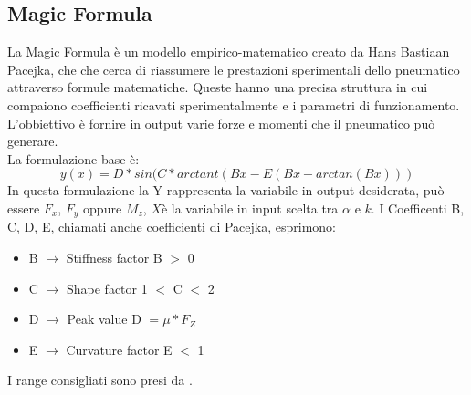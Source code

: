 \subsection{Magic Formula}
La Magic Formula è un modello empirico-matematico creato da Hans Bastiaan Pacejka, che che cerca di riassumere le prestazioni sperimentali dello pneumatico attraverso formule matematiche. Queste hanno una precisa struttura in cui compaiono coefficienti ricavati sperimentalmente e i parametri di funzionamento. L'obbiettivo è fornire in output varie forze e momenti che il pneumatico può generare.\\
La formulazione base è:
\begin{equation}
\label{eq:Pacjeka}
    y(x)=D*sin(C*arctant(Bx-E(Bx-arctan(Bx)))
\end{equation}
In questa formulazione la Y rappresenta la variabile in output desiderata, può essere
$F_x$, $F_y$ oppure $M_z$, $X$è la variabile in input scelta tra $\alpha$ e $k$. I Coefficenti B, C, D, E, chiamati anche coefficienti di Pacejka, esprimono:
\begin{itemize}
    \item B $\longrightarrow$ Stiffness factor \hspace{2.3cm} B $>$ 0
    \item C $\longrightarrow$ Shape factor \hspace{2.3cm} 1 $<$ C $<$ 2
    \item D $\longrightarrow$ Peak value  \hspace{2.6cm} D $= \mu*F_Z$
    \item E $\longrightarrow$ Curvature factor \hspace{2cm} E $<$ 1
\end{itemize}
I range consigliati sono presi da \cite{Guiggiani}.

